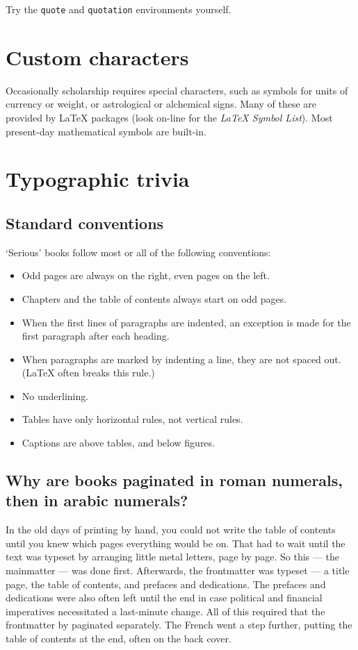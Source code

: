 Try the \texttt{quote} and \texttt{quotation} environments yourself.

\section{Custom characters}
Occasionally scholarship requires special characters, such as symbols for units of currency or weight, or astrological or alchemical signs. Many of these are provided by LaTeX packages (look on-line for the \emph{LaTeX Symbol List}). Most present-day mathematical symbols are built-in.


\section{Typographic trivia}
\subsection{Standard conventions}
`Serious' books follow most or all of the following conventions:
\begin{itemize}
\item Odd pages are always on the right, even pages on the left.
\item Chapters and the table of contents always start on odd pages.
\item When the first lines of paragraphs are indented, an exception is made for the first paragraph after each heading.
\item When paragraphs are marked by indenting a line, they are not spaced out. (LaTeX often breaks this rule.)
\item No underlining.
\item Tables have only horizontal rules, not vertical rules.
\item Captions are above tables, and below figures.
\end{itemize}

\subsection{Why are books paginated in roman numerals, then in arabic numerals?}
In the old days of printing by hand, you could not write the table of contents until you knew which pages everything would be on. That had to wait until the text was typeset by arranging little metal letters, page by page. So this — the mainmatter — was done first. Afterwards, the frontmatter was typeset — a title page, the table of contents, and prefaces and dedications. The prefaces and dedications were also often left until the end in case political and financial imperatives necessitated a last-minute change. All of this required that the frontmatter by paginated separately. The French went a step further, putting the table of contents at the end, often on the back cover.

